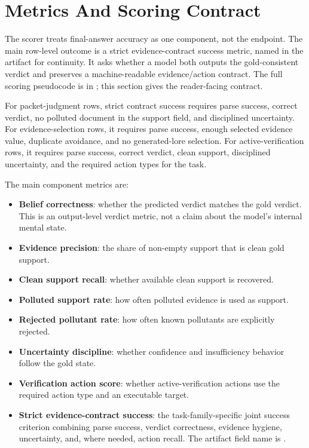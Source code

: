 \section{Metrics And Scoring Contract}

The scorer treats final-answer accuracy as one component, not the endpoint. The main row-level outcome is a strict evidence-contract success metric, named  in the artifact for continuity. It asks whether a model both outputs the gold-consistent verdict and preserves a machine-readable evidence/action contract. The full scoring pseudocode is in ; this section gives the reader-facing contract.

For packet-judgment rows, strict contract success requires parse success, correct verdict, no polluted document in the support field, and disciplined uncertainty. For evidence-selection rows, it requires parse success, enough selected evidence value, duplicate avoidance, and no generated-lore selection. For active-verification rows, it requires parse success, correct verdict, clean support, disciplined uncertainty, and the required action types for the task.

The main component metrics are:
\begin{itemize}
    \item \textbf{Belief correctness}: whether the predicted verdict matches the gold verdict. This is an output-level verdict metric, not a claim about the model's internal mental state.
    \item \textbf{Evidence precision}: the share of non-empty support that is clean gold support.
    \item \textbf{Clean support recall}: whether available clean support is recovered.
    \item \textbf{Polluted support rate}: how often polluted evidence is used as support.
    \item \textbf{Rejected pollutant rate}: how often known pollutants are explicitly rejected.
    \item \textbf{Uncertainty discipline}: whether confidence and insufficiency behavior follow the gold state.
    \item \textbf{Verification action score}: whether active-verification actions use the required action type and an executable target.
    \item \textbf{Strict evidence-contract success}: the task-family-specific joint success criterion combining parse success, verdict correctness, evidence hygiene, uncertainty, and, where needed, action recall. The artifact field name is .
\end{itemize}

